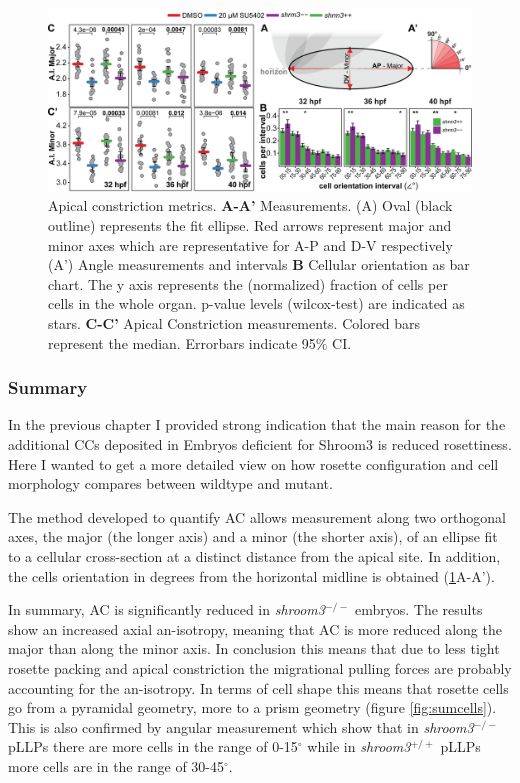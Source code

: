 \documentclass[10pt, b5paper, singlespacinge, twoside]{reedthesis} %
\theoremstyle{definition}
\theoremstyle{definition}
\theoremstyle{definition}
\theoremstyle{remark}
\begin{document}
\begin{figure}

{\centering \includegraphics[width=0.95\linewidth]{figures/results/04_constriction/Figure_5-2} 

}

\caption[3D metrics and pLLP maps]{Apical constriction metrics. \textbf{A-A'} Measurements. (A) Oval (black outline) represents the fit ellipse. Red arrows represent major and minor axes which are representative for A-P and D-V respectively (A') Angle measurements and intervals \textbf{B} Cellular orientation as bar chart. The y axis represents the (normalized) fraction of cells per cells in the whole organ. p-value levels (wilcox-test) are indicated as stars. \textbf{C-C'} Apical Constriction measurements. Colored bars represent the median. Errorbars indicate 95\(\%\) CI.}\label{fig:acaci}
\end{figure}
\hypertarget{sum-ai}{%
\subsubsection{Summary}\label{sum-ai}}

In the previous chapter I provided strong indication that the main reason for the additional CCs deposited in Embryos deficient for Shroom3 is reduced rosettiness. Here I wanted to get a more detailed view on how rosette configuration and cell morphology compares between wildtype and mutant.

The method developed to quantify AC allows measurement along two orthogonal axes, the major (the longer axis) and a minor (the shorter axis), of an ellipse fit to a cellular cross-section at a distinct distance from the apical site. In addition, the cells orientation in degrees from the horizontal midline is obtained (\ref{fig:acaci}A-A').

In summary, AC is significantly reduced in \emph{shroom3}\(^{-/-}\) embryos. The results show an increased axial an-isotropy, meaning that AC is more reduced along the major than along the minor axis. In conclusion this means that due to less tight rosette packing and apical constriction the migrational pulling forces are probably accounting for the an-isotropy. In terms of cell shape this means that rosette cells go from a pyramidal geometry, more to a prism geometry (figure \ref{fig:sumcells}). This is also confirmed by angular measurement which show that in \emph{shroom3}\(^{-/-}\) pLLPs there are more cells in the range of 0-15\(^\circ\) while in \emph{shroom3}\(^{+/+}\) pLLPs more cells are in the range of 30-45\(^\circ\).
\end{document}
